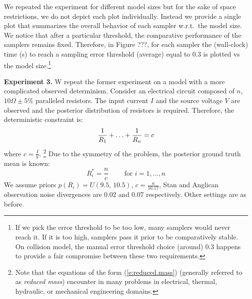 \documentclass{article}
\newcommand{\pr}{p}
\begin{document}
We repeated the experiment for different model sizes but for the sake of space restrictions, we do not depict each plot individually.
Instead we provide a single plot that summarizes the overall behavior of each sampler w.r.t.\ the model size.
We notice that after a particular threshold, the comparative performance of the samplers remains fixed.
Therefore, in Figure ???, for each sampler the (wall-clock) time (s) to reach a sampling error threshold (average) equal to 0.3 is plotted vs the model size.\footnote{
If we pick the error threshold to be too low, many samplers would never reach it. If it is too high, samplers pass it prior to be comparatively stable. On collision model, the manual error threshold choice (around) 0.3 happens to provide a fair compromise between these two requirements.  
}%

  
%


\textbf{Experiment 3.} W repeat the former experiment on a model with a more complicated observed determinism. 
Consider an electrical circuit composed of $n$, $10\Omega\pm5\%$ paralleled resistors.
The input current $I$ and the source voltage $V$ are observed
and the posterior distribution of resistors is required.
Therefore, the deterministic constraint is:
\begin{equation} \footnotesize 
\label{e:reduced.mass}
 \frac{1}{R_1} + \ldots + \frac{1}{R_n} = c
\end{equation}
where $c = \frac{I}{V}$.
\footnote{
Note that the equations of the form (\ref{e:reduced.mass}) (generally referred to as \emph{reduced mass}) encounter in many problems in electrical, thermal, hydraulic, or mechanical engineering domains. 
}
Due to the symmetry of the problem, the posterior ground truth mean is known:
\begin{equation*}
R_i^* = \frac{n}{c} \qquad \text{ for } i = 1, \ldots, n
\end{equation*}
We assume 
priors $\pr(R_i) = U(9.5, \, 10.5)$, 
$c = \frac{n}{10.17}$,
Stan and Anglican observation noise divergences are 
0.02 and 0.07 respectively. Other settings are as before.
\end{document}
